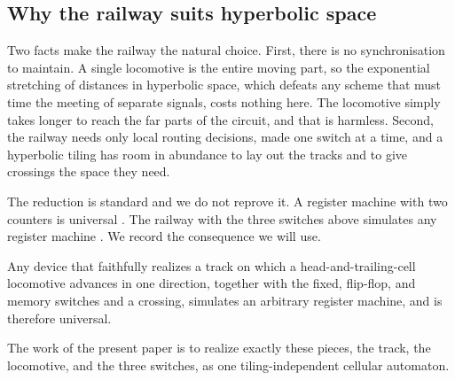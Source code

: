 \subsection{Why the railway suits hyperbolic space}

Two facts make the railway the natural choice. First, there is no synchronisation to maintain. A single
locomotive is the entire moving part, so the exponential stretching of distances in hyperbolic space, which
defeats any scheme that must time the meeting of separate signals, costs nothing here. The locomotive simply
takes longer to reach the far parts of the circuit, and that is harmless. Second, the railway needs only local
routing decisions, made one switch at a time, and a hyperbolic tiling has room in abundance to lay out the
tracks and to give crossings the space they need.

The reduction is standard and we do not reprove it. A register machine with two counters is universal
\cite{minsky1967}. The railway with the three switches above simulates any register machine
\cite{stewart1994, margenstern2008vol2}. We record the consequence we will use.

\begin{proposition}
\label{prop:railway}
Any device that faithfully realizes a track on which a head-and-trailing-cell locomotive advances in one
direction, together with the fixed, flip-flop, and memory switches and a crossing, simulates an arbitrary
register machine, and is therefore universal.
\end{proposition}

The work of the present paper is to realize exactly these pieces, the track, the locomotive, and the three
switches, as one tiling-independent cellular automaton.
